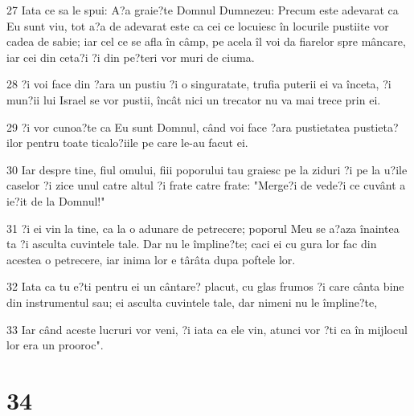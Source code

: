 \par 27 Iata ce sa le spui: A?a graie?te Domnul Dumnezeu: Precum este adevarat ca Eu sunt viu, tot a?a de adevarat este ca cei ce locuiesc în locurile pustiite vor cadea de sabie; iar cel ce se afla în câmp, pe acela îl voi da fiarelor spre mâncare, iar cei din ceta?i ?i din pe?teri vor muri de ciuma.
\par 28 ?i voi face din ?ara un pustiu ?i o singuratate, trufia puterii ei va înceta, ?i mun?ii lui Israel se vor pustii, încât nici un trecator nu va mai trece prin ei.
\par 29 ?i vor cunoa?te ca Eu sunt Domnul, când voi face ?ara pustietatea pustieta?ilor pentru toate ticalo?iile pe care le-au facut ei.
\par 30 Iar despre tine, fiul omului, fiii poporului tau graiesc pe la ziduri ?i pe la u?ile caselor ?i zice unul catre altul ?i frate catre frate: "Merge?i de vede?i ce cuvânt a ie?it de la Domnul!"
\par 31 ?i ei vin la tine, ca la o adunare de petrecere; poporul Meu se a?aza înaintea ta ?i asculta cuvintele tale. Dar nu le împline?te; caci ei cu gura lor fac din acestea o petrecere, iar inima lor e târâta dupa poftele lor.
\par 32 Iata ca tu e?ti pentru ei un cântare? placut, cu glas frumos ?i care cânta bine din instrumentul sau; ei asculta cuvintele tale, dar nimeni nu le împline?te,
\par 33 Iar când aceste lucruri vor veni, ?i iata ca ele vin, atunci vor ?ti ca în mijlocul lor era un prooroc".

\chapter{34}

